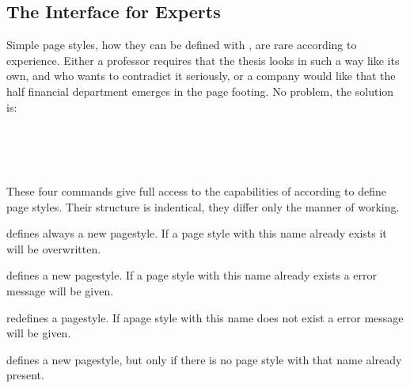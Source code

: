 \subsection{The Interface for Experts}\label{sec:scrpage.UI.expert}
{}
Simple page styles, how they can be defined with ,
are rare according to experience.
Either a professor requires that the thesis looks in
such a way like its own, and who wants to contradict
it seriously, or a company would like that the half
financial department emerges in the page footing.
No problem, the solution is:
%
\begin{Declaration}
\\
\\
\\
\end{Declaration}%
These four commands give full access to the capabilities of
 according to define page styles.
Their structure is indentical, they differ only the manner of working.

\begin{labeling}[\,--]{}
\item[\Macro{defpagestyle}] defines always a new pagestyle.
If a page style with this name already exists it will be overwritten.
\item[\Macro{newpagestyle}] defines a new pagestyle.
If a page style with this name already exists a error message will be given.
\item[\Macro{renewpagestyle}] redefines a pagestyle.
If apage style with this name does not exist a error message will be given.
\item[\Macro{providepagestyle}] defines a new pagestyle,
but only if there is no page style with that name already present.
\end{labeling}

